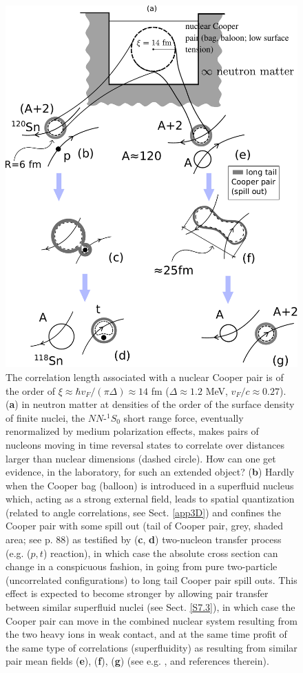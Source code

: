 \begin{figure}
	\centerline{\includegraphics*[width=12cm,angle=0]{nutshell/figs/fig_gamma.pdf}}
\caption{The correlation length associated with a nuclear Cooper pair is of the order of $\xi\approx \hbar v_F/(\pi\Delta)\approx 14 $ fm ($\Delta\approx1.2$ MeV, $v_F/c\approx0.27$).(\textbf{a}) in neutron matter at densities  of the order of the surface density of finite nuclei, the $NN$-$^{1}S_0$ short range force, eventually renormalized by medium polarization effects, makes pairs of nucleons moving in time reversal states to correlate over distances larger than nuclear dimensions (dashed circle). How can one get evidence, in the laboratory, for such an extended object? (\textbf{b}) Hardly when the Cooper bag (balloon) is introduced in  a superfluid nucleus  which, acting as a  strong external field, leads to spatial quantization (related to angle correlations, see Sect. \ref{app3D}) and confines the Cooper pair  with some spill out (tail of Cooper pair, grey, shaded area; see \cite{Bertsch:05} p. 88) as testified by (\textbf{c}, \textbf{d}) two-nucleon transfer process (e.g. ($p,t$) reaction), in which case the absolute cross section can change in a conspicuous fashion, in going from pure two-particle (uncorrelated configurations) to long tail Cooper pair spill outs. This effect is expected to become stronger by allowing pair transfer between similar superfluid nuclei (see Sect. \ref{S7.3}), in which case the Cooper pair can move in the combined nuclear system resulting from the two heavy ions in weak contact, and at the same time profit of the same type of correlations (superfluidity) as resulting from  similar pair mean fields (\textbf{e}), (\textbf{f}), (\textbf{g}) (see e.g. \cite{Oertzen:13,vonOertzen:01}, and references therein). 
}\label{fig_gamma}
\end{figure}
